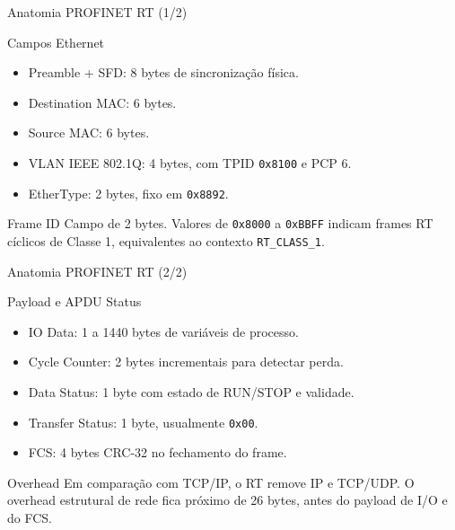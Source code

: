 \documentclass[10pt, aspectratio=169]{beamer}
\begin{document}
\begin{frame}{Anatomia PROFINET RT (1/2)}
    \small
    \begin{block}{Campos Ethernet}
        \begin{itemize}
            \item Preamble + SFD: 8 bytes de sincroniza\c{c}\~ao f\'isica.
            \item Destination MAC: 6 bytes.
            \item Source MAC: 6 bytes.
            \item VLAN IEEE 802.1Q: 4 bytes, com TPID \texttt{0x8100} e PCP 6.
            \item EtherType: 2 bytes, fixo em \alert{\texttt{0x8892}}.
        \end{itemize}
    \end{block}

    \begin{block}{Frame ID}
        Campo de 2 bytes. Valores de \texttt{0x8000} a \texttt{0xBBFF} indicam frames RT c\'iclicos de Classe 1, equivalentes ao contexto \texttt{RT\_CLASS\_1}.
    \end{block}
\end{frame}

\begin{frame}{Anatomia PROFINET RT (2/2)}
    \small
    \begin{block}{Payload e APDU Status}
        \begin{itemize}
            \item IO Data: 1 a 1440 bytes de vari\'aveis de processo.
            \item Cycle Counter: 2 bytes incrementais para detectar perda.
            \item Data Status: 1 byte com estado de RUN/STOP e validade.
            \item Transfer Status: 1 byte, usualmente \texttt{0x00}.
            \item FCS: 4 bytes CRC-32 no fechamento do frame.
        \end{itemize}
    \end{block}

    \begin{block}{Overhead}
        Em compara\c{c}\~ao com TCP/IP, o RT remove IP e TCP/UDP. O overhead estrutural de rede fica pr\'oximo de 26 bytes, antes do payload de I/O e do FCS.
    \end{block}
\end{frame}
\end{document}
